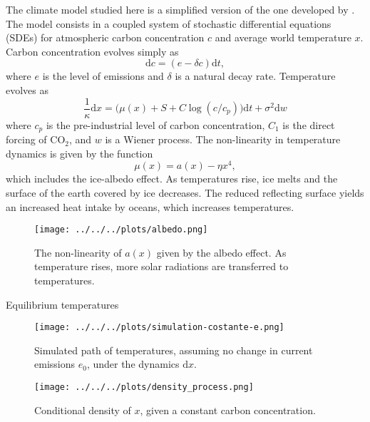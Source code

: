 \documentclass[../../main.tex]{subfiles}
\begin{document}
The climate model studied here is a simplified version of the one developed by . The model consists in a coupled system of stochastic differential equations (SDEs) for atmospheric carbon concentration $c$ and average world temperature $x$. Carbon concentration evolves simply as \begin{equation} \label{eq:climate-model-c}
    \text{d}c = (e - \delta c) \text{d} t,
\end{equation} where $e$ is the level of emissions and $\delta$ is a natural decay rate. Temperature evolves as \begin{equation} \label{eq:climate-model-x}
    \frac{1}{\kappa} \text{d}x = \Big( \mu(x) + S + C \log(c / c_p) \Big) \text{d} t + \sigma^2 \text{d}w
\end{equation} where $c_p$ is the pre-industrial level of carbon concentration, $C_1$ is the direct forcing of CO$_2$, and $w$ is a Wiener process. The non-linearity in temperature dynamics is given by the function \begin{equation}
    \mu(x) = a(x) - \eta x^4,
\end{equation} which includes the ice-albedo effect. As temperatures rise, ice melts and the surface of the earth covered by ice decreases. The reduced reflecting surface yields an increased heat intake by oceans, which increases temperatures.

\begin{figure}[H]
    \centering
    \texttt{[image: ../../../plots/albedo.png]}
    \caption{The non-linearity of $a(x)$ given by the albedo effect. As temperature rises, more solar radiations are transferred to temperatures.}
\end{figure}

Equilibrium temperatures

\begin{figure}[H]
    \centering
    \texttt{[image: ../../../plots/simulation-costante-e.png]}
    \caption{Simulated path of temperatures, assuming no change in current emissions $e_0$, under the dynamics $\text{d}x$.}
    \label{fig:x-sim}
\end{figure}


\begin{figure}[H]
    \centering
    \texttt{[image: ../../../plots/density\_process.png]}
    \caption{Conditional density of $x$, given a constant carbon concentration.}
    \label{fig:x-dens}
\end{figure}
\end{document}
